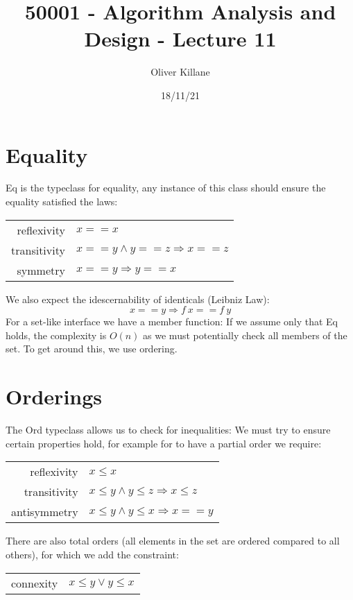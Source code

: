 \documentclass{report}
\title{50001 - Algorithm Analysis and Design - Lecture 11}
\author{Oliver Killane}
\date{18/11/21}
\begin{document}
\maketitle
{}

\section*{Equality}
Eq is the typeclass for equality, any instance of this class should ensure the equality satisfied the laws:
\begin{center}
	\begin{tabular}{r l}
		reflexivity  & $x == x$                                 \\
		transitivity & $x == y \land y == z \Rightarrow x == z$ \\
		symmetry     & $x == y \Rightarrow y == x$              \\
	\end{tabular}
\end{center}
We also expect the idescernability of identicals (Leibniz Law):
\[x == y \Rightarrow f \ x == f \ y\]
For a set-like interface we have a member function:
If we assume only that Eq holds, the complexity is $O(n)$ as we must potentially check all members of the set. To get around this, we use ordering.

\section*{Orderings}
The Ord typeclass allows us to check for inequalities:
We must try to ensure certain properties hold, for example for to have a partial order we require:
\begin{center}
	\begin{tabular}{r l}
		reflexivity  & $x \leq x$                                     \\
		transitivity & $x \leq y \land y \leq z \Rightarrow x \leq z$ \\
		antisymmetry & $x \leq y \land y \leq x \Rightarrow x == y$   \\
	\end{tabular}
\end{center}
There are also total orders (all elements in the set are ordered compared to all others), for which we add the constraint:
\begin{center}
	\begin{tabular}{r l}
		connexity & $x \leq y \lor y \leq x$ \\
	\end{tabular}
\end{center}
\end{document}
